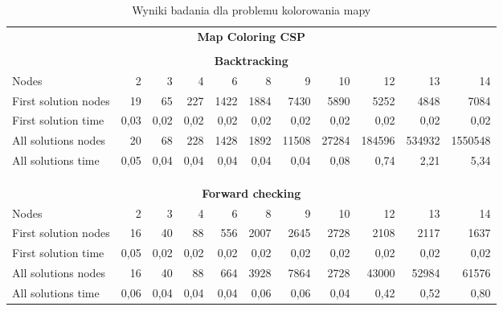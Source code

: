 \documentclass[12pt,a4paper]{article}
\begin{document}
\begin{table}[htbp]
  \centering
    \begin{tabular}{lrrrrrrrrrr}
    \multicolumn{11}{c}{\textbf{Map Coloring CSP}} \\
          &       &       &       &       &       &       &       &       &       &  \\
    \multicolumn{11}{c}{\textbf{Backtracking}} \\
    Nodes & 2     & 3     & 4     & 6     & 8     & 9     & 10    & 12    & 13    & 14 \\
\cmidrule{2-11}    First solution nodes & 19    & 65    & 227   & 1422  & 1884  & 7430  & 5890  & 5252  & 4848  & 7084 \\
    First solution time & 0,03  & 0,02  & 0,02  & 0,02  & 0,02  & 0,02  & 0,02  & 0,02  & 0,02  & 0,02 \\
    All solutions nodes & 20    & 68    & 228   & 1428  & 1892  & 11508 & 27284 & 184596 & 534932 & 1550548 \\
    All solutions time & 0,05  & 0,04  & 0,04  & 0,04  & 0,04  & 0,04  & 0,08  & 0,74  & 2,21  & 5,34 \\
          &       &       &       &       &       &       &       &       &       &  \\
          &       &       &       &       &       &       &       &       &       &  \\
          &       &       &       &       &       &       &       &       &       &  \\
    \multicolumn{11}{c}{\textbf{Forward checking}} \\
    Nodes & 2     & 3     & 4     & 6     & 8     & 9     & 10    & 12    & 13    & 14 \\
\cmidrule{2-11}    First solution nodes & 16    & 40    & 88    & 556   & 2007  & 2645  & 2728  & 2108  & 2117  & 1637 \\
    First solution time & 0,05  & 0,02  & 0,02  & 0,02  & 0,02  & 0,02  & 0,02  & 0,02  & 0,02  & 0,02 \\
    All solutions nodes & 16    & 40    & 88    & 664   & 3928  & 7864  & 2728  & 43000 & 52984 & 61576 \\
    All solutions time & 0,06  & 0,04  & 0,04  & 0,04  & 0,06  & 0,06  & 0,04  & 0,42  & 0,52  & 0,80 \\
    \end{tabular}%
  \caption{Wyniki badania dla problemu kolorowania mapy}
  \label{tab:addlabel}%
\end{table}%
\end{document}
